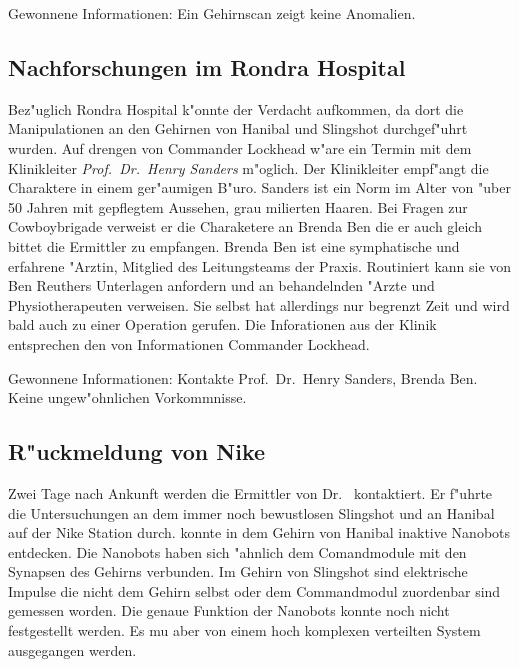 \begin{remarks}
	Gewonnene Informationen: Ein Gehirnscan zeigt keine Anomalien.
\end{remarks}


\subsection{Nachforschungen im Rondra Hospital}

Bez"uglich Rondra Hospital k"onnte der Verdacht aufkommen, da\3 dort die Manipulationen an den Gehirnen von Hanibal und Slingshot durchgef"uhrt wurden. Auf drengen von Commander Lockhead w"are ein Termin mit dem Klinikleiter \emph{Prof.~Dr.~Henry Sanders} m"oglich. Der Klinikleiter empf"angt die Charaktere in einem ger"aumigen B"uro. Sanders ist ein Norm im Alter von "uber 50 Jahren mit gepflegtem Aussehen, grau milierten Haaren. Bei Fragen zur Cowboybrigade verweist er die Charaketere an Brenda Ben die er auch gleich bittet die Ermittler zu empfangen. Brenda Ben ist eine symphatische und erfahrene "Arztin, Mitglied des Leitungsteams der Praxis. Routiniert kann sie von Ben Reuthers Unterlagen anfordern und an behandelnden "Arzte und Physiotherapeuten verweisen. Sie selbst hat allerdings nur begrenzt Zeit und wird bald auch zu einer Operation gerufen. Die Inforationen aus der Klinik entsprechen den von Informationen Commander Lockhead.

\begin{remarks}
	Gewonnene Informationen: Kontakte Prof.~Dr.~Henry Sanders, Brenda Ben. Keine ungew"ohnlichen Vorkommnisse.
\end{remarks}


\subsection{R"uckmeldung von Nike}

Zwei Tage nach Ankunft werden die Ermittler von Dr.~  kontaktiert. Er f"uhrte die Untersuchungen an dem immer noch bewustlosen Slingshot und an Hanibal auf der Nike Station durch.   konnte in dem Gehirn von Hanibal inaktive Nanobots entdecken. Die Nanobots haben sich "ahnlich dem Comandmodule mit den Synapsen des Gehirns verbunden. Im Gehirn von Slingshot sind elektrische Impulse die nicht dem Gehirn selbst oder dem Commandmodul zuordenbar sind gemessen worden. Die genaue Funktion der Nanobots konnte noch nicht festgestellt werden. Es mu\3 aber von einem hoch komplexen verteilten System ausgegangen werden.

